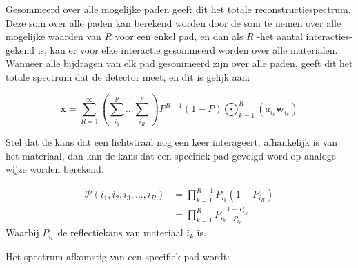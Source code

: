 \documentclass[12pt]{report}
\DeclareMathOperator*{\Odot}{\bigodot}
\begin{document}
Gesommeerd over alle mogelijke paden geeft dit het totale reconstructiespectrum. Deze som over alle paden kan berekend worden door de som te nemen over alle mogelijke waarden van $R$ voor een enkel pad, en dan als $R$ -het aantal interacties- gekend is, kan er voor elke interactie gesommeerd worden over alle materialen. Wanneer alle bijdragen van elk pad gesommeerd zijn over alle paden, geeft dit het totale spectrum dat de detector meet, en dit is gelijk aan:

\begin{equation}
\bm{x} = \sum_{R=1}^{\infty} \left(\sum_{i_1}^{p} ... \sum_{i_R}^{p}\right)P^{R-1} (1-P) \Odot_{k=1}^R \left(a_{i_k} \bm{w}_{i_k}\right)
\end{equation}

Stel dat de kans dat een lichtstraal nog een keer interageert, afhankelijk is van het materiaal, dan kan de kans dat een specifiek pad gevolgd word op analoge wijze worden berekend.

\begin{align}
\mathcal{P}(i_1,i_2,i_3,...,i_R) &= \prod_{k=1}^{R-1}P_{i_k} (1-P_{i_R})\\
&= \prod_{k=1}^{R}P_{i_k} \frac{1-P_{i_R}}{P_{i_R}}
\end{align}
Waarbij $P_{i_k}$ de reflectiekans van materiaal $i_k$ is. 

Het spectrum afkomstig van een specifiek pad wordt:
\end{document}
